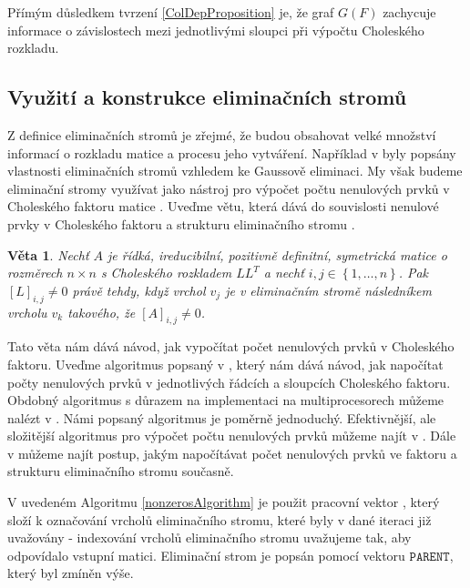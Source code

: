 \documentclass[11pt,american,czech,oneside]{book}
\theoremstyle{plain}
\newtheorem{theorem}{Věta}
\theoremstyle{definition}
\begin{document}
Přímým důsledkem tvrzení \ref{ColDepProposition} je, že graf $G(F)$ zachycuje informace o závislostech mezi jednotlivými sloupci při výpočtu Choleského rozkladu. 

\subsection{Využití a konstrukce eliminačních stromů}
\label{EltreeAlgSection}

Z definice eliminačních stromů je zřejmé, že budou obsahovat velké množství informací o rozkladu matice a procesu jeho vytváření. Například v \cite{schr:82} byly popsány vlastnosti eliminačních stromů vzhledem ke Gaussově eliminaci. My však budeme eliminační stromy využívat jako nástroj pro výpočet počtu nenulových prvků v Choleského faktoru matice \cite{liu:90}. Uveďme větu, která dává do souvislosti nenulové prvky v Choleského faktoru a strukturu eliminačního stromu \cite{liu:86}.

\begin{theorem}
  Nechť $A$ je řídká, ireducibilní, pozitivně definitní, symetrická matice o rozměrech $n \times n$ s Choleského rozkladem $LL^T$ a nechť $i,j \in \left\{1,\ldots,n \right\}$. Pak $[L]_{i,j} \neq 0$ právě tehdy, když vrchol $v_j$ je v eliminačním stromě následníkem vrcholu $v_k$ takového, že $[A]_{i,j} \neq 0$.
\end{theorem}

Tato věta nám dává návod, jak vypočítat počet nenulových prvků v Choleského faktoru. Uveďme algoritmus popsaný v \cite{liu:90}, který nám dává návod, jak napočítat počty nenulových prvků v jednotlivých řádcích a sloupcích Choleského faktoru. Obdobný algoritmus s důrazem na implementaci na multiprocesorech můžeme nalézt v \cite{zmgi:88}. Námi popsaný algoritmus je poměrně jednoduchý. Efektivnější, ale složitější algoritmus pro výpočet počtu nenulových prvků můžeme najít v \cite{gil:94}. Dále v \cite{basm:87} můžeme najít postup, jakým napočítávat počet nenulových prvků ve faktoru a strukturu eliminačního stromu současně.

V uvedeném Algoritmu \ref{nonzerosAlgorithm} je použit pracovní vektor \Marker, který složí k označování vrcholů eliminačního stromu, které byly v dané iteraci již uvažovány - indexování vrcholů eliminačního stromu uvažujeme tak, aby odpovídalo vstupní matici. Eliminační strom je popsán pomocí vektoru $\texttt{PARENT}$, který byl zmíněn výše.
\end{document}
